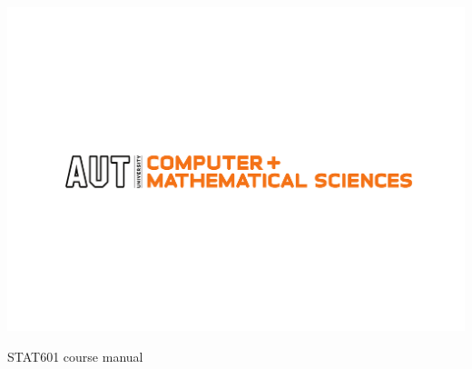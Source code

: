 
\includegraphics{AUT_COMP_MATH_CMYK}

\begin{centering}
{\Huge STAT601 course manual}
\end{centering}


